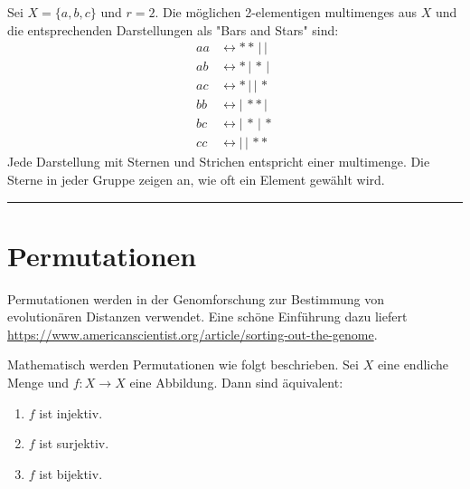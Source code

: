 \documentclass[9pt]{article}
\begin{document}
\begin{bsp}
Sei \( X = \{a, b, c\} \) und \( r = 2 \). Die möglichen 2-elementigen \glspl{multimenge} aus \( X \) und die entsprechenden Darstellungen als "Bars and Stars" sind:
\begin{align*}
aa &\leftrightarrow * * \, | \, | \\
ab &\leftrightarrow * \, | \, * \, | \\
ac &\leftrightarrow * \, | \, | \, * \\
bb &\leftrightarrow | \, * * \, | \\
bc &\leftrightarrow | \, * \, | \, * \\
cc &\leftrightarrow | \, | \, * * 
\end{align*}
Jede Darstellung mit Sternen und Strichen entspricht einer \gls{multimenge}. Die Sterne in jeder Gruppe zeigen an, wie oft ein Element gewählt wird.
\end{bsp} \noindent \rule{8cm}{0.4pt}
\section{Permutationen}
Permutationen werden in der Genomforschung zur Bestimmung von evolutionären Distanzen verwendet. Eine schöne Einführung dazu liefert
\url{https://www.americanscientist.org/article/sorting-out-the-genome}.

Mathematisch werden Permutationen wie folgt beschrieben. Sei \( X \) eine endliche Menge und \( f : X \to X \) eine Abbildung. Dann sind äquivalent:

\begin{enumerate}
    \item \( f \) ist injektiv.
    \item \( f \) ist surjektiv.
    \item \( f \) ist bijektiv.
\end{enumerate}
\end{document}
